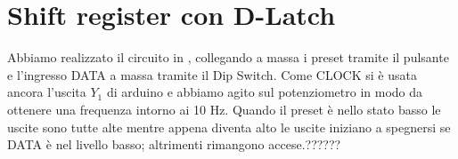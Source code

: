 \section{Shift register con D-Latch}
Abbiamo realizzato il circuito in  , collegando a massa i preset tramite il pulsante e l'ingresso DATA a massa tramite il Dip Switch. Come CLOCK si è usata ancora l'uscita $Y_1$ di arduino e abbiamo agito sul potenziometro in modo da ottenere una frequenza intorno ai 10 Hz. Quando il preset è nello stato basso le uscite sono tutte alte mentre appena diventa alto le uscite iniziano a spegnersi se DATA è nel livello basso; altrimenti rimangono accese.??????